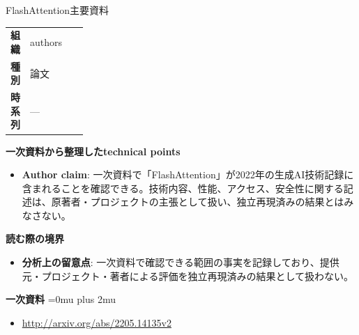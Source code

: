 \begin{technicalnote}{FlashAttention}{主要資料}
\begingroup
\begin{tabularx}{\linewidth}{@{}>{\bfseries}p{0.22\linewidth}X@{}}
組織 & authors \\
種別 & 論文 \\
時系列 & — \\
\end{tabularx}
\smallskip
{\bfseries 一次資料から整理したtechnical points}
\begin{itemize}[leftmargin=1.5em,itemsep=0.35em]
\item \textbf{Author claim}: 一次資料で「FlashAttention」が2022年の生成AI技術記録に含まれることを確認できる。技術内容、性能、アクセス、安全性に関する記述は、原著者・プロジェクトの主張として扱い、独立再現済みの結果とはみなさない。
\end{itemize}
\begin{minipage}{\linewidth}
{\bfseries 読む際の境界}
\begin{itemize}[leftmargin=1.5em,itemsep=0.35em]
\item \textbf{分析上の留意点}: 一次資料で確認できる範囲の事実を記録しており、提供元・プロジェクト・著者による評価を独立再現済みの結果として扱わない。
\end{itemize}
\begin{samepage}
{\bfseries 一次資料}
\begingroup\sloppy
\Urlmuskip=0mu plus 2mu\relax
\begin{itemize}[leftmargin=1.5em,itemsep=0.25em]
\item {\scriptsize\url{http://arxiv.org/abs/2205.14135v2}}
\end{itemize}
\endgroup
\end{samepage}
\end{minipage}
\endgroup
\end{technicalnote}
\medskip


